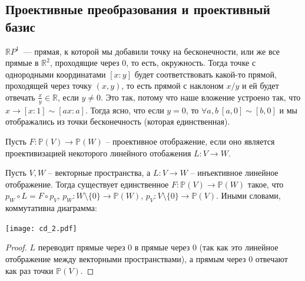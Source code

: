 \documentclass[11pt]{article}
\begin{document}
    \subsection{Проективные преобразования и проективный базис}
    \begin{example}
    $\mathbb{R}P^1$~--- прямая, к которой мы добавили точку на бесконечности, или же все прямые в $\mathbb{R}^2$, проходящие через 0, то есть, окружность.
     Тогда точке с однородными координатами $[x:y]$ будет соответствовать какой-то прямой, проходящей через точку $(x, y)$, то есть прямой с наклоном $x / y$ и ей будет отвечать $\frac{x}{y} \in \mathbb{R}$, если $y \neq 0$.
    Это так, потому что наше вложение устроено так, что $x \to [x : 1] \sim [ax : a]$. Тогда ясно, что если $y = 0$, то $\forall a, b \ [a, 0] \sim [b, 0]$ и мы отображались из точки бесконечность (которая единственная).
    \end{example}
     \begin{definition}
         Пусть $F\colon \mathbb{P}(V) \to \mathbb{P}(W)$ -- проективное отображение, если оно является проективизацией некоторого линейного отобажения $L\colon V \to W$.
    \end{definition}
    \begin{lemma}
        Пусть $V, W$ -- векторные пространства, а $L\colon V \to W$ --   инъективное линейное отображение. Тогда существует единственное $F\colon \mathbb{P}(V) \to \mathbb{P}(W)$ такое, что
        $p_W \circ L = F \circ p_V$, $p_W \colon W \setminus \{ 0\} \to \mathbb{P}(W)$, $p_V \colon V \setminus \{ 0\} \to \mathbb{P}(V)$.
        Иными словами, коммутативна диаграмма:
        \begin{center}
            \texttt{[image: cd\_2.pdf]}
        \end{center}
    \end{lemma}
    \begin{proof}
        $L$ переводит прямые через 0 в прямые через 0 (так как это линейное отображение между векторными пространствами), а прямым через 0 отвечают как раз точки $\mathbb{P}(V)$.
    \end{proof}
\end{document}
